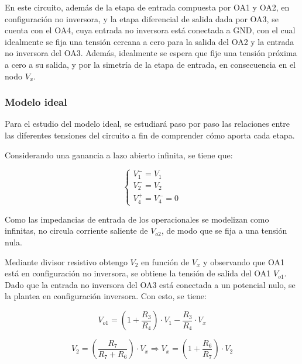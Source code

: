 En este circuito, además de la etapa de entrada compuesta por OA1 y OA2, en configuración no inversora, y la etapa diferencial de salida dada por OA3, se cuenta con el OA4, cuya entrada no inversora está conectada a GND, con el cual idealmente se fija una tensión cercana a cero para la salida del OA2 y la entrada no inversora del OA3. Además, idealmente se espera que fije una tensión próxima a cero a su salida, y por la simetría de la etapa de entrada, en consecuencia en el nodo $V_x$. 

\subsubsection{Modelo ideal}

Para el estudio del modelo ideal, se estudiará paso por paso las relaciones entre las diferentes tensiones del circuito a fin de comprender cómo aporta cada etapa. 

Considerando una ganancia a lazo abierto infinita, se tiene que:

\begin{equation}
        \left\{
        \begin{array}{lll}
                
                V^{-}_{1} = V_{1}\\
                
                V^{-}_{2} = V_{2}\\
                
                V^{+}_{4} = V^{-}_{4}=0
            \end{array}
        \right.
\end{equation}

Como las impedancias de entrada de los operacionales se modelizan como infinitas, no circula corriente saliente de $V_{o2}$, de modo que se fija a una tensión nula. 

Mediante divisor resistivo obtengo $V_2$ en función de $V_x$ y observando que OA1 está en configuración no inversora, se obtiene la tensión de salida del OA1 $V_{o1}$. Dado que la entrada no inversora del OA3 está conectada a un potencial nulo, se la plantea en configuración inversora. Con esto, se tiene:

$$V_{o1} = \left(1+\frac{R_3}{R_4}\right)\cdot V_{1}  - \frac{R_3}{R_4}\cdot V_x$$
                
$$V_2 = (\frac{R_{7}}{R_{7}+R_{6}}) \cdot V_x \Rightarrow V_x = (1+\frac{R_6}{R_7}) \cdot V_2$$
                
